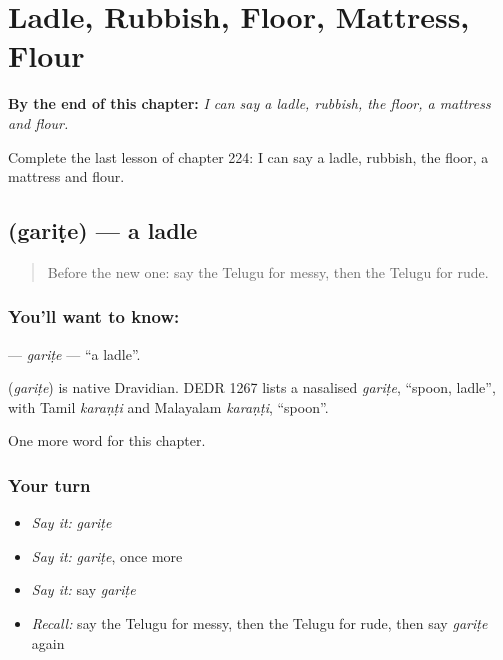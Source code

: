 
\chapter{Ladle, Rubbish, Floor, Mattress, Flour}
\label{ch:te-ladle-rubbish-floor-mattress-flour}

\begin{chapteropening}
\textbf{By the end of this chapter:} \emph{I can say a ladle, rubbish, the floor, a mattress and flour.}

Complete the last lesson of chapter 224: I can say a ladle, rubbish, the floor, a mattress and flour.
\end{chapteropening}

\section[\texorpdfstring{\te{గరిటె} (gariṭe)}{గరిటె (gariṭe)}]{ (gariṭe) — a ladle}

\label{lesson:TE-C224-garite}



\begin{quote}
Before the new one: say the Telugu for messy, then the Telugu for rude.
\end{quote}

\subsection*{You'll want to know: }
\textbf{} — \emph{gariṭe} — \textquotedblleft{}a ladle\textquotedblright{}.

\begin{cousinweb}
\textbf{} (\emph{gariṭe}) is native Dravidian. DEDR 1267 lists a nasalised \emph{gariṭe}, \textquotedblleft{}spoon, ladle\textquotedblright{}, with Tamil \emph{karaṇṭi} and Malayalam \emph{karaṇṭi}, \textquotedblleft{}spoon\textquotedblright{}.
\end{cousinweb}

\begin{grammarlens}[title={What you've built}]
One more word for this chapter.
\end{grammarlens}

\subsection*{Your turn}
\begin{itemize}
\raggedright
  \item \emph{Say it:} \emph{gariṭe}
  \item \emph{Say it:} \emph{gariṭe}, once more
  \item \emph{Say it:} say \emph{gariṭe}
  \item \emph{Recall:} say the Telugu for messy, then the Telugu for rude, then say \emph{gariṭe} again
\end{itemize}

